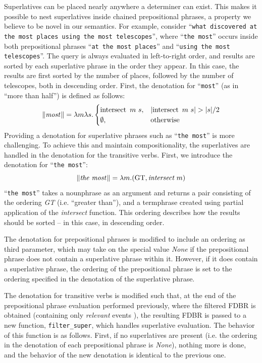 \documentclass[../main.tex]{subfiles}
\begin{document}
\begin{refsection}
Superlatives can be placed nearly anywhere a determiner can exist.
This makes it possible to nest superlatives inside chained prepositional phrases, a property we believe to be novel in our semantics.  For example, consider ``\texttt{what discovered at the most places using the most telescopes}'', where ``\texttt{the most}'' occurs inside both prepositional phrases ``\texttt{at the most places}'' and ``\texttt{using the most telescopes}''.  The query is always evaluated in left-to-right order, and results are sorted by each superlative phrase in the order they appear. In this case, the results are first sorted by the number of places, followed by the number of telescopes, both in descending order.
First, the denotation for ``\texttt{most}'' (as in ``more than half'') is defined as follows:
\begin{equation*}
	\lVert\textit{most\hspace{0.1em}}\rVert = \lambda m \lambda s.
	\begin{cases}
		\operatorname{intersect}\ m\ s, & \lvert\operatorname{intersect}\ m\ s\rvert > \lvert{s}\rvert/2 \\
		\emptyset, & \text{otherwise}
	\end{cases}
\end{equation*}
Providing a denotation for superlative phrases such as ``\texttt{the most}'' is more challenging. To achieve this and maintain compositionality, the superlatives are handled in the denotation for the transitive verbs.
First, we introduce the denotation for ``\texttt{the most}'':
\begin{equation*}
	\lVert\textit{the\ most\hspace{0.1em}}\rVert = \lambda m.(\text{GT}, \textit{intersect}\ m)
\end{equation*}
``\texttt{the most}'' takes a nounphrase as an argument and returns a pair consisting of the ordering \textit{GT} (i.e. ``greater than''), and a termphrase created using partial application of the \textit{intersect} function.  This ordering describes how the results should be sorted -- in this case, in descending order.

The denotation for prepositional phrases is modified to include an ordering as third parameter, which may take on the special value \textit{None} if the prepositional phrase does not contain a superlative phrase within it.  However, if it does contain a superlative phrase, the ordering of the prepositional phrase is set to the ordering specified in the denotation of the superlative phrase.

The denotation for transitive verbs is modified such that, at the end of the prepositional phrase evaluation performed previously, where the filtered FDBR is obtained (containing only {\em relevant} events \cite{peelar2016accommodating}), the resulting FDBR is passed to a new function, \texttt{filter\_super}, which handles superlative evaluation.  The behavior of this function is as follows.  First, if no superlatives are present (i.e. the ordering in the denotation of each prepositional phrase is \textit{None}), nothing more is done, and the behavior of the new denotation is identical to the previous one.


\end{refsection}
\end{document}

